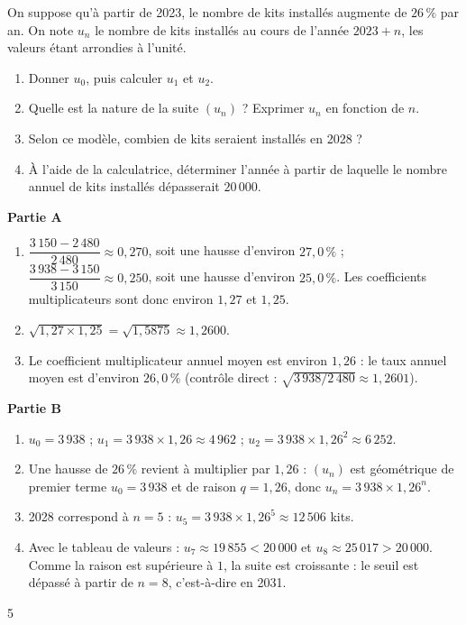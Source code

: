 {On suppose qu'à partir de 2023, le nombre de kits installés augmente de $26\,\%$ par an. On note $u_n$ le nombre de kits installés au cours de l'année $2023+n$, les valeurs étant arrondies à l'unité.
\begin{enumerate}
\item Donner $u_0$, puis calculer $u_1$ et $u_2$.
\item Quelle est la nature de la suite $(u_n)$ ? Exprimer $u_n$ en fonction de $n$.
\item Selon ce modèle, combien de kits seraient installés en 2028 ?
\item À l'aide de la calculatrice, déterminer l'année à partir de laquelle le nombre annuel de kits installés dépasserait $20\,000$.
\end{enumerate}
}{%
\textbf{Partie A}
\begin{enumerate}
\item $\dfrac{3\,150-2\,480}{2\,480}\approx0{,}270$, soit une hausse d'environ $27{,}0\,\%$ ; $\dfrac{3\,938-3\,150}{3\,150}\approx0{,}250$, soit une hausse d'environ $25{,}0\,\%$. Les coefficients multiplicateurs sont donc environ $1{,}27$ et $1{,}25$.
\item $\sqrt{1{,}27\times1{,}25}=\sqrt{1{,}5875}\approx1{,}2600$.
\item Le coefficient multiplicateur annuel moyen est environ $1{,}26$ : le taux annuel moyen est d'environ $26{,}0\,\%$ (contrôle direct : $\sqrt{3\,938/2\,480}\approx1{,}2601$).
\end{enumerate}
\textbf{Partie B}
\begin{enumerate}
\item $u_0=3\,938$ ; $u_1=3\,938\times1{,}26\approx4\,962$ ; $u_2=3\,938\times1{,}26^2\approx6\,252$.
\item Une hausse de $26\,\%$ revient à multiplier par $1{,}26$ : $(u_n)$ est géométrique de premier terme $u_0=3\,938$ et de raison $q=1{,}26$, donc $u_n=3\,938\times1{,}26^n$.
\item 2028 correspond à $n=5$ : $u_5=3\,938\times1{,}26^5\approx12\,506$ kits.
\item Avec le tableau de valeurs : $u_7\approx19\,855<20\,000$ et $u_8\approx25\,017>20\,000$. Comme la raison est supérieure à $1$, la suite est croissante : le seuil est dépassé à partir de $n=8$, c'est-à-dire en 2031.
\end{enumerate}
}{5}

